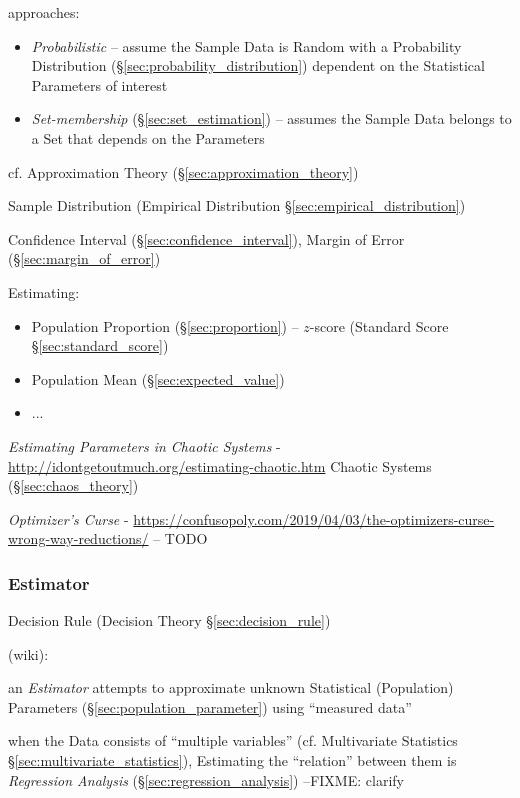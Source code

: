 approaches:
\begin{itemize}
  \item \emph{Probabilistic} -- assume the Sample Data is Random with a
    Probability Distribution (\S\ref{sec:probability_distribution}) dependent on
    the Statistical Parameters of interest
  \item \emph{Set-membership} (\S\ref{sec:set_estimation}) -- assumes the
    Sample Data belongs to a Set that depends on the Parameters
\end{itemize}

\fist cf. Approximation Theory (\S\ref{sec:approximation_theory})

Sample Distribution (Empirical Distribution \S\ref{sec:empirical_distribution})

Confidence Interval (\S\ref{sec:confidence_interval}), Margin of Error
(\S\ref{sec:margin_of_error})

Estimating:
\begin{itemize}
  \item Population Proportion (\S\ref{sec:proportion}) -- $z$-score (Standard
    Score \S\ref{sec:standard_score})
  \item Population Mean (\S\ref{sec:expected_value})
  \item ...
\end{itemize}

\emph{Estimating Parameters in Chaotic Systems} -
\url{http://idontgetoutmuch.org/estimating-chaotic.htm} \fist Chaotic Systems
(\S\ref{sec:chaos_theory})

\asterism

\emph{Optimizer's Curse} -
\url{https://confusopoly.com/2019/04/03/the-optimizers-curse-wrong-way-reductions/}
-- TODO



\subsubsection{Estimator}\label{sec:estimator}

\fist Decision Rule (Decision Theory \S\ref{sec:decision_rule})

(wiki):

an \emph{Estimator} attempts to approximate unknown Statistical (Population)
Parameters (\S\ref{sec:population_parameter}) using ``measured data''

when the Data consists of ``multiple variables'' (cf. Multivariate Statistics
\S\ref{sec:multivariate_statistics}), Estimating the ``relation'' between them
is \emph{Regression Analysis} (\S\ref{sec:regression_analysis})
--FIXME: clarify

